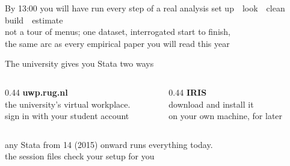 \documentclass[aspectratio=169,11pt]{beamer}
\begin{document}
\begin{frame}{By 13:00 you will have run every step of a real analysis}
  \vfill
  \centering
  {\ttfamily\Large\color{Ink}
   set up \,\textrightarrow\, look \,\textrightarrow\, clean
   \,\textrightarrow\, build \,\textrightarrow\, estimate}\\[2.0em]
  {\color{WarmGray}not a tour of menus; one dataset, interrogated start
   to finish,\\ the same arc as every empirical paper you will read this year}
  \vfill
\end{frame}

\begin{frame}{The university gives you Stata two ways}
  \vspace*{0.9cm}
  \begin{columns}[T]
    \begin{column}{0.44\textwidth}
      \centering
      {\ttfamily\bfseries\color{SlateTeal}uwp.rug.nl}\\[0.6em]
      {\small the university's virtual workplace.\\
       sign in with your student account}
    \end{column}
    \begin{column}{0.44\textwidth}
      \centering
      {\ttfamily\bfseries\color{SlateTeal}IRIS}\\[0.6em]
      {\small download and install it\\ on your own machine, for later}
    \end{column}
  \end{columns}
  \vspace*{1.6cm}
  \centering
  {\color{WarmGray}any Stata from 14 (2015) onward runs everything today.\\
   the session files check your setup for you}
\end{frame}
\end{document}
